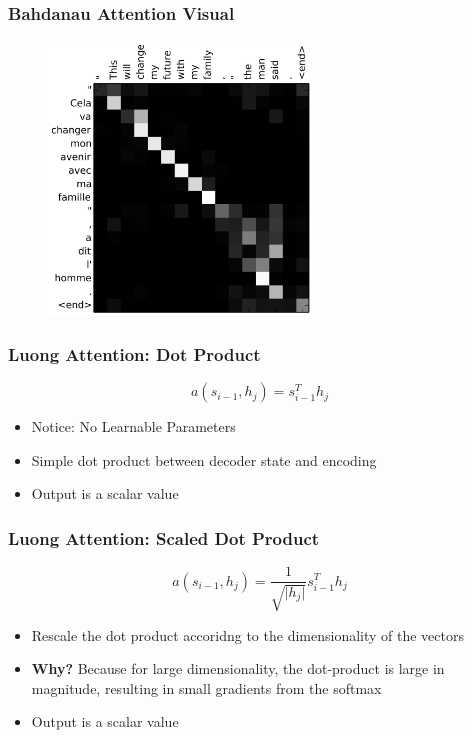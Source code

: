 \documentclass[usenames,dvipsnames]{beamer}
\begin{document}
\begin{frame}
  \frametitle{Bahdanau Attention Visual}
  \begin{figure}
    \includegraphics[height=7.25cm]{assets/concat2}
  \end{figure}
\end{frame}


\begin{frame}
\frametitle{Luong Attention: Dot Product}
\begin{equation*}
  a\left( s_{i-1}, h_j \right) = s_{i-1}^T h_j
\end{equation*}
\begin{itemize}
  \item Notice: No Learnable Parameters
  \item Simple dot product between decoder state and encoding
  \item Output is a scalar value
\end{itemize}
\end{frame}

\begin{frame}
\frametitle{Luong Attention: Scaled Dot Product}
\begin{equation*}
  a\left( s_{i-1}, h_j \right) = \frac{1}{\sqrt{\lvert h_j \rvert}} s_{i-1}^T h_j
\end{equation*}
\begin{itemize}
  \item Rescale the dot product accoridng to the dimensionality of the vectors
  \item \textbf{Why?} Because for large dimensionality, the dot-product is large in magnitude, resulting in small gradients from the softmax
  \item Output is a scalar value
\end{itemize}
\end{frame}
\end{document}
